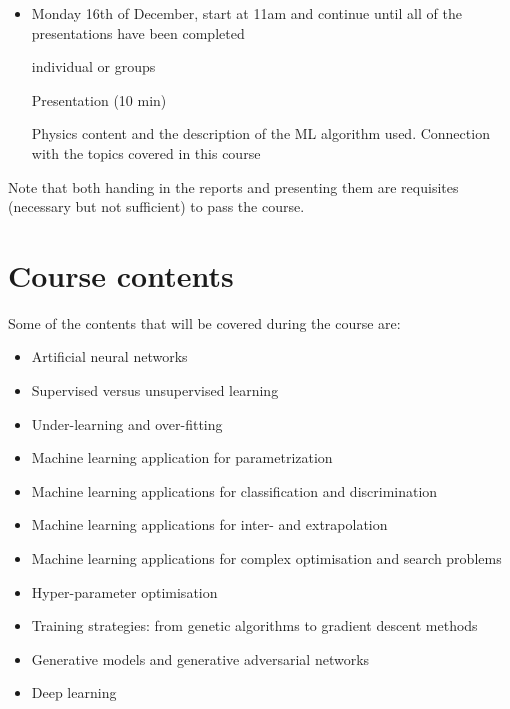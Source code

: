 \documentclass[12pt]{article}
\numberwithin{equation}{section}
\begin{document}
\begin{spacing}{1.1}
\begin{itemize}
\item Monday 16th of December, start at 11am and continue until all of the presentations
have been completed

individual or groups

Presentation (10 min)

Physics content and the description of the ML algorithm used.
Connection with the topics covered in this course

\end{itemize}  

Note that both handing in the reports and presenting them
are requisites (necessary but not sufficient) to pass the course.


\section{Course contents}

Some of the contents that will be covered during the course are:

\begin{itemize}

\item Artificial neural networks

\item Supervised versus unsupervised learning

\item Under-learning and over-fitting  

\item Machine learning application for parametrization 

\item Machine learning applications for classification and discrimination

\item Machine learning applications for inter- and extrapolation
  
\item Machine learning applications for complex optimisation and search problems

\item Hyper-parameter optimisation

\item Training strategies: from genetic algorithms to gradient descent methods

\item Generative models and generative adversarial networks

\item Deep learning  


\end{itemize}
\end{spacing}
\end{document}
